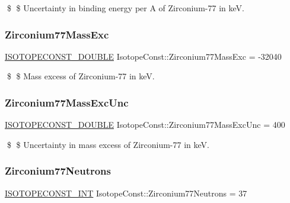 \$ \$ Uncertainty in binding energy per A of Zirconium-\/77 in keV. \mbox{\label{group___isotope_const-_zirconium-_zr77_gaead61dcc1d0b5b4fa224503055db6706}} 
\subsubsection{\texorpdfstring{Zirconium77\+Mass\+Exc}{Zirconium77MassExc}}
{\footnotesize\ttfamily \mbox{\hyperlink{group___isotope_const-_macros_ga8f45a7272ce02c0b4c65c44636ed719a}{I\+S\+O\+T\+O\+P\+E\+C\+O\+N\+S\+T\+\_\+\+D\+O\+U\+B\+LE}} Isotope\+Const\+::\+Zirconium77\+Mass\+Exc = -\/32040}

\$ \$ Mass excess of Zirconium-\/77 in keV. \mbox{\label{group___isotope_const-_zirconium-_zr77_ga35157e37d975e64341929407b8d6ebca}} 
\subsubsection{\texorpdfstring{Zirconium77\+Mass\+Exc\+Unc}{Zirconium77MassExcUnc}}
{\footnotesize\ttfamily \mbox{\hyperlink{group___isotope_const-_macros_ga8f45a7272ce02c0b4c65c44636ed719a}{I\+S\+O\+T\+O\+P\+E\+C\+O\+N\+S\+T\+\_\+\+D\+O\+U\+B\+LE}} Isotope\+Const\+::\+Zirconium77\+Mass\+Exc\+Unc = 400}

\$ \$ Uncertainty in mass excess of Zirconium-\/77 in keV. \mbox{\label{group___isotope_const-_zirconium-_zr77_ga4a6ecc72ab2b677bc8937b2ce841a34e}} 
\subsubsection{\texorpdfstring{Zirconium77\+Neutrons}{Zirconium77Neutrons}}
{\footnotesize\ttfamily \mbox{\hyperlink{group___isotope_const-_macros_ga5f18360b3e99483a35c32d789e62621c}{I\+S\+O\+T\+O\+P\+E\+C\+O\+N\+S\+T\+\_\+\+I\+NT}} Isotope\+Const\+::\+Zirconium77\+Neutrons = 37}

